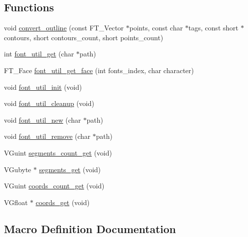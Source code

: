 \subsection*{Functions}
\begin{DoxyCompactItemize}
\item 
void \hyperlink{font-util_8c_a2e1f4f43990064db73c98ffb44b99201}{convert\+\_\+outline} (const F\+T\+\_\+\+Vector $\ast$points, const char $\ast$tags, const short $\ast$contours, short contours\+\_\+count, short points\+\_\+count)
\item 
int \hyperlink{font-util_8c_ab67157cbf375fb8580de7c957fbd3626}{font\+\_\+util\+\_\+get} (char $\ast$path)
\item 
F\+T\+\_\+\+Face \hyperlink{font-util_8c_a17cd259b0b9dd2e02bd08f7f3f3c5b58}{font\+\_\+util\+\_\+get\+\_\+face} (int fonts\+\_\+index, char character)
\item 
void \hyperlink{font-util_8c_ace26dcda0550c0649bdfd9168e963c27}{font\+\_\+util\+\_\+init} (void)
\item 
void \hyperlink{font-util_8c_ab1a9b6e2faff61b99fc4302f6388c352}{font\+\_\+util\+\_\+cleanup} (void)
\item 
void \hyperlink{font-util_8c_a8c16da6fd800e231ec79a4f3a6b8b70a}{font\+\_\+util\+\_\+new} (char $\ast$path)
\item 
void \hyperlink{font-util_8c_a4187fe09f2ceb1ed6ec21a877521aaf2}{font\+\_\+util\+\_\+remove} (char $\ast$path)
\item 
V\+Guint \hyperlink{font-util_8c_a3f7b521baa3aabbf1cfdb95366d8c6a1}{segments\+\_\+count\+\_\+get} (void)
\item 
V\+Gubyte $\ast$ \hyperlink{font-util_8c_a172b6b169cd4108eaa3412788db42220}{segments\+\_\+get} (void)
\item 
V\+Guint \hyperlink{font-util_8c_a684c2dd54133ee0f96fa398f00e9dbd7}{coords\+\_\+count\+\_\+get} (void)
\item 
V\+Gfloat $\ast$ \hyperlink{font-util_8c_a0da680a50f460d392d95aacde6ecdbba}{coords\+\_\+get} (void)
\end{DoxyCompactItemize}


\subsection{Macro Definition Documentation}
\hypertarget{font-util_8c_a3328f7792ae2c0722a0ad16bce879029}{}

